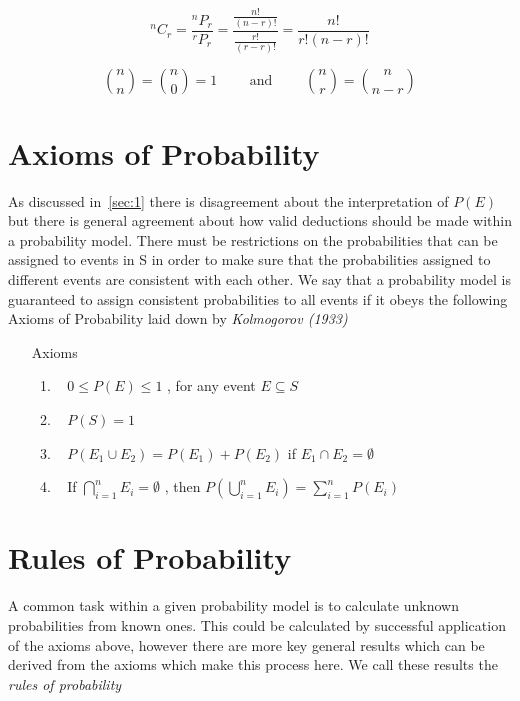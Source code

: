 \documentclass[english,course]{Notes}
\newcommand{\ita}[1]{\textit{#1}}
\newcommand\comb[2]{^{#1}C_{#2}}
\newcommand\perm[2]{^{#1}P_{#2}}
\begin{document}
$$\comb{n}{r} = \frac{\perm{n}{r}}{\perm{r}{r}} = \frac{\frac{n!}{(n-r)!}}{\frac{r!}{(r-r)!}} = \frac{n!}{r!(n-r)!}$$

 $${ n \choose n} = {n \choose 0 } = 1 \qquad \text{ and } \qquad  {n \choose r }= {n \choose {n-r}}$$
 
 \section{Axioms of Probability}
 
 \par{As discussed in~\ref{sec:1} there is disagreement about the interpretation of $P(E)$ but there is general agreement about how valid deductions should be made within a probability model. There must be restrictions on the probabilities that can be assigned to events in S in order to make sure that the probabilities assigned to different events are consistent with each other. We say that a probability model is guaranteed to assign consistent probabilities to all events if it obeys the
following Axioms of Probability laid down by \ita{Kolmogorov (1933)}}
 
 \begin{itemize}
 \item[Axioms]
 \begin{enumerate}
 \item~\label{itm:ax1} $0 \leq P(E) \leq 1$ , for any event $E \subseteq S$ 
 \item~\label{itm:ax2} $P(S) = 1$ 
 \item~\label{itm:ax3}  $P(E_{1} \cup E_{2}) = P(E_{1}) + P(E_{2})$ if $E_{1} \cap E_{2} = \emptyset$ 
 \item~\label{itm:ax4} If $\bigcap_{i=1}^{n}E_{i} = \emptyset$ , then $P(\bigcup_{i=1}^{n}E_{i}) = \sum_{i=1}^{n} P(E_{i})$ 
 \end{enumerate}
 \end{itemize}
 

 
\section{Rules of Probability}

\par{A common task within a given probability model is to calculate unknown probabilities from known ones. This could be calculated by successful application of the axioms above, however there are more key general results which can be derived from the axioms which make this process here. We call these results the \ita{rules of probability}}
\end{document}
